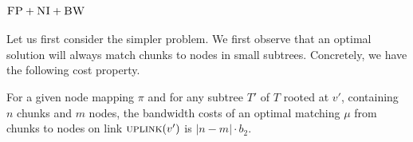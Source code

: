 \documentclass[9pt,twocolumn]{scrartcl}
\newcommand{\VmChunkAssignment}{\mu}
\newcommand{\NodeMapping}{\pi}
\newcommand{\SubstrateNode}{\ensuremath{v}}
\newcommand{\Uplink}{\ensuremath{\textsc{uplink}}}
\newcommand{\CC}{\textsc{NI}}
\newcommand{\FP}{\textsc{FP}}
\newcommand{\BW}{\textsc{BW}}
\newcommand{\Tree}{\ensuremath{T}}
\newcommand{\CostTrans}{\ensuremath{b_2}}
\begin{document}
\subsubsection{$\FP+\CC+\BW$}

Let us first consider the simpler problem.
We first observe that an optimal solution will always
match chunks to nodes in small subtrees. Concretely,
we have the following cost property.

\begin{lemma}
\label{lemma:local_matching}
For a given node mapping $\NodeMapping$ and for any subtree $\Tree'$
of $\Tree$ rooted at $\SubstrateNode'$, containing $n$ chunks and $m$
nodes, the bandwidth costs of an optimal matching $\VmChunkAssignment$ 
from chunks to nodes on link $\Uplink(\SubstrateNode')$ is $|n
- m| \cdot \CostTrans$.
\end{lemma}
\end{document}
